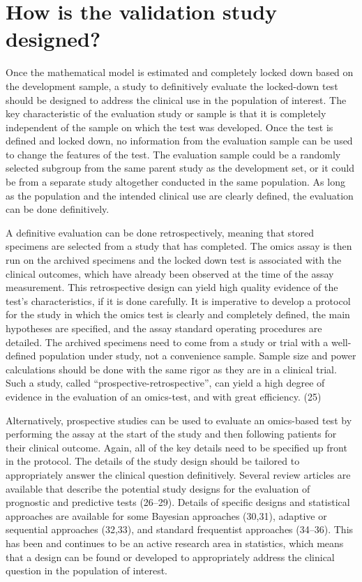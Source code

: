 \documentclass[11pt]{article}
\begin{document}
\section{How is the validation study
designed?}\label{how-is-the-validation-study-designed}

Once the mathematical model is estimated and completely locked down
based on the development sample, a study to definitively evaluate the
locked-down test should be designed to address the clinical use in the
population of interest. The key characteristic of the evaluation study
or sample is that it is completely independent of the sample on which
the test was developed. Once the test is defined and locked down, no
information from the evaluation sample can be used to change the
features of the test. The evaluation sample could be a randomly selected
subgroup from the same parent study as the development set, or it could
be from a separate study altogether conducted in the same population. As
long as the population and the intended clinical use are clearly
defined, the evaluation can be done definitively.

A definitive evaluation can be done retrospectively, meaning that stored
specimens are selected from a study that has completed. The omics assay
is then run on the archived specimens and the locked down test is
associated with the clinical outcomes, which have already been observed
at the time of the assay measurement. This retrospective design can
yield high quality evidence of the test's characteristics, if it is done
carefully. It is imperative to develop a protocol for the study in which
the omics test is clearly and completely defined, the main hypotheses
are specified, and the assay standard operating procedures are detailed.
The archived specimens need to come from a study or trial with a
well-defined population under study, not a convenience sample. Sample
size and power calculations should be done with the same rigor as they
are in a clinical trial. Such a study, called
``prospective-retrospective'', can yield a high degree of evidence in
the evaluation of an omics-test, and with great efficiency. (25)

Alternatively, prospective studies can be used to evaluate an
omics-based test by performing the assay at the start of the study and
then following patients for their clinical outcome. Again, all of the
key details need to be specified up front in the protocol. The details
of the study design should be tailored to appropriately answer the
clinical question definitively. Several review articles are available
that describe the potential study designs for the evaluation of
prognostic and predictive tests (26--29). Details of specific designs
and statistical approaches are available for some Bayesian approaches
(30,31), adaptive or sequential approaches (32,33), and standard
frequentist approaches (34--36). This has been and continues to be an
active research area in statistics, which means that a design can be
found or developed to appropriately address the clinical question in the
population of interest.
\end{document}
